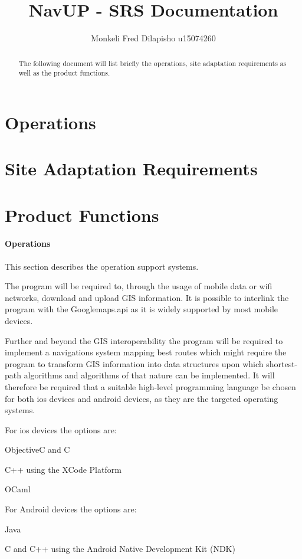 \documentclass[]{article}
\title{NavUP - SRS Documentation}
\author{Monkeli Fred Dilapisho u15074260}
\begin{document}
\maketitle

\begin{abstract}
	\begin{center}
		The following document will list briefly the operations, site adaptation requirements as well as the product functions.
	\end{center}
\end{abstract}

\section{Operations}
\section{Site Adaptation Requirements}
\section {Product Functions}

\paragraph{Operations}
	\begin{center}
		This section describes the operation support systems.
		
		The program will be required to, through the usage of mobile data or wifi networks, download and upload GIS information. It is possible to interlink the program with the Googlemaps.api as it is widely supported by most mobile devices.
		
		Further and beyond the GIS interoperability the program will be required to implement a navigations system mapping best routes which might require the program to transform GIS information into data structures upon which shortest-path algorithms and algorithms of that nature can be implemented. It will therefore be required that a suitable high-level programming language be chosen for both ios devices and android devices, as they are the targeted operating systems.
		
		For ios devices the options are:
		\begin{list}{}{}
			
			\item ObjectiveC and C
			\item C++ using the XCode Platform
			\item OCaml
		\end{list} 
	
		For Android devices the options are:
			\begin{list}{}{}
				\item Java
				\item C and C++ using the Android Native Development Kit (NDK)
			\end{list}
	\end{center}
\end{document}
